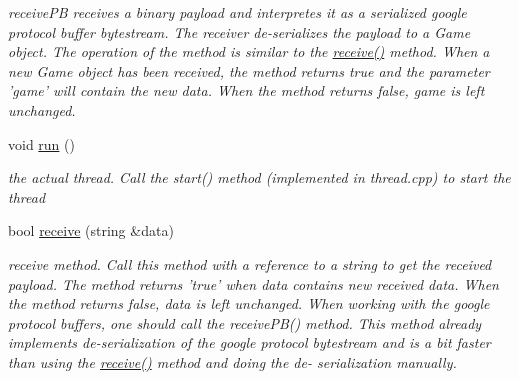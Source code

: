 \begin{DoxyCompactItemize}
\begin{DoxyCompactList}\small\item\em receive\-P\-B receives a binary payload and interpretes it as a serialized google protocol buffer bytestream. The receiver de-\/serializes the payload to a Game object. The operation of the method is similar to the \hyperlink{class_wificlient_aab4bf3fdc0dc322772f16fa2a19490c6}{receive()} method. When a new Game object has been received, the method returns true and the parameter 'game' will contain the new data. When the method returns false, game is left unchanged. \end{DoxyCompactList}\item 
void \hyperlink{class_wificlient_a0f1ded9f8252ef5094915c6ff9bf1d40}{run} ()
\begin{DoxyCompactList}\small\item\em the actual thread. Call the start() method (implemented in thread.\-cpp) to start the thread \end{DoxyCompactList}\item 
\hypertarget{class_wificlient_aab4bf3fdc0dc322772f16fa2a19490c6}{bool \hyperlink{class_wificlient_aab4bf3fdc0dc322772f16fa2a19490c6}{receive} (string \&data)}\label{class_wificlient_aab4bf3fdc0dc322772f16fa2a19490c6}

\begin{DoxyCompactList}\small\item\em receive method. Call this method with a reference to a string to get the received payload. The method returns 'true' when data contains new received data. When the method returns false, data is left unchanged. When working with the google protocol buffers, one should call the receive\-P\-B() method. This method already implements de-\/serialization of the google protocol bytestream and is a bit faster than using the \hyperlink{class_wificlient_aab4bf3fdc0dc322772f16fa2a19490c6}{receive()} method and doing the de-\/ serialization manually. \end{DoxyCompactList}\end{DoxyCompactItemize}
